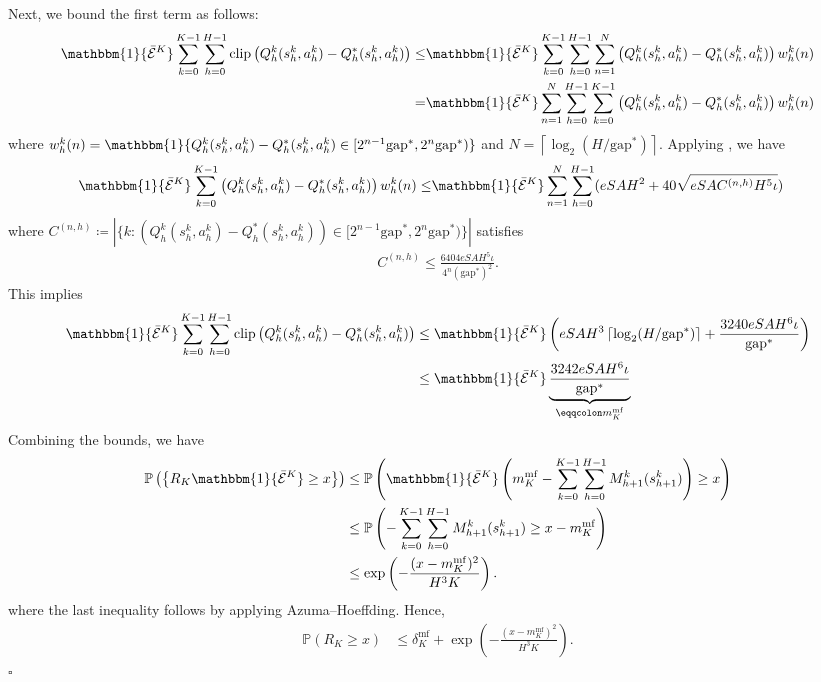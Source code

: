 \documentclass[11pt]{article}
\newcommand{\PP}{\mathbb{P}}
\newcommand{\Dvsm}{M}
\newcommand{\clip}{\mathrm{clip}}
\newcommand{\ceil}[1]{\left\lceil #1\right\rceil}
\newcommand{\gapstar}{\mathrm{gap}^*}
\begin{document}
Next, we bound the first term as follows:
\begin{align*}
    \mathbbm{1}\{\bar{\mathcal{E}}^K\}\sum_{k=0}^{K-1}\sum_{h=0}^{H-1}\clip\left(Q_h^{k}(s_h^k,a_h^k) - Q_h^{*}(s_h^k,a_h^k)\right) \leq & \mathbbm{1}\{\bar{\mathcal{E}}^K\}\sum_{k=0}^{K-1}\sum_{h=0}^{H-1} \sum_{n=1}^{N}\left(Q_h^{k}(s_h^k,a_h^k) - Q_h^{*}(s_h^k,a_h^k)\right) w_h^k(n) \\
    =&\mathbbm{1}\{\bar{\mathcal{E}}^K\} \sum_{n=1}^{N}\sum_{h=0}^{H-1}\sum_{k=0}^{K-1} \left(Q_h^{k}(s_h^k,a_h^k) - Q_h^{*}(s_h^k,a_h^k)\right) w_h^k(n)
\end{align*}
where $w_h^k(n) = \mathbbm{1}\{Q_h^{k}(s_h^k,a_h^k) - Q_h^{*}(s_h^k,a_h^k) \in [2^{n-1}\gapstar,2^n\gapstar)\}$ and $N=\ceil{\log_2(H/\gapstar)}$. Applying \cite[Proof of Lemma 4.2]{yang2021q}, we have
\begin{align*}
        \mathbbm{1}\{\bar{\mathcal{E}}^K\} \sum_{k=0}^{K-1} \left(Q_h^{k}(s_h^k,a_h^k) - Q_h^{*}(s_h^k,a_h^k)\right) w_h^k(n)\leq & \mathbbm{1}\{\bar{\mathcal{E}}^K\} \sum_{n=1}^{N}\sum_{h=0}^{H-1} (eSAH^2+ 40\sqrt{eSA C^{(n,h)} H^5\iota}) 
\end{align*}
where $C^{(n,h)} \coloneqq \left|\{k: (Q_h^{k}(s_h^k,a_h^k) - Q_h^{*}(s_h^k,a_h^k)) \in [2^{n-1}\gapstar,2^n\gapstar)\}\right|$ satisfies 
\begin{align*}
 C^{(n,h)} \leq  \frac{6404eSAH^5\iota }{4^{n} (\gapstar)^2}.
\end{align*}
This implies
\begin{align}
    \mathbbm{1}\{\bar{\mathcal{E}}^K\}\sum_{k=0}^{K-1}\sum_{h=0}^{H-1}\clip\left(Q_h^{k}(s_h^k,a_h^k) - Q_h^{*}(s_h^k,a_h^k)\right) \nonumber
    &\leq \mathbbm{1}\{\bar{\mathcal{E}}^K\} \left(eSAH^3 \ceil{\log_2(H/\gapstar)} + \frac{3240 eSAH^6\iota}{\gapstar}\right)\nonumber\\
    &\leq \mathbbm{1}\{\bar{\mathcal{E}}^K\}  \underbrace{\frac{3242 eSAH^6\iota}{\gapstar}}_{\eqqcolon m_K^{\mathrm{mf}}} \label{eq:19_before}
\end{align}
Combining the bounds, we have
\begin{align*}
    \PP\left( \left\{R_K \mathbbm{1}\{\bar{\mathcal{E}}^K\} \geq x \right\}\right) 
    &\leq\PP\left( \mathbbm{1}\{\bar{\mathcal{E}}^K\}\left(m_K^{\mathrm{mf}} - \sum_{k=0}^{K-1} \sum_{h=0}^{H-1}\Dvsm^k_{h+1}(s_{h+1}^k) \right) \geq  x \right)\\
    &\leq\PP\left(-\sum_{k=0}^{K-1}\sum_{h=0}^{H-1} \Dvsm_{h+1}^k(s_{h+1}^k) \geq  x - m_K^{\mathrm{mf}}\right)\\
    &\leq \exp \left( - \frac{(x- m_K^{\mathrm{mf}})^2}{H^3K}\right).
\end{align*}
where the last inequality follows by applying Azuma–Hoeffding. Hence,
\begin{align*}
    \PP(R_K\geq x) &\leq \delta_K^{\mathrm{mf}} + \exp \left( - \frac{(x- m_K^{\mathrm{mf}})^2}{H^3K}\right). 
\end{align*}\hfill$\square$
\end{document}
